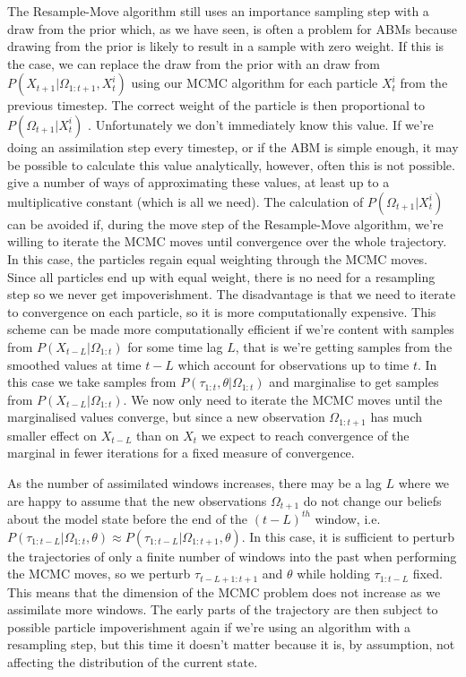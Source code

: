 \documentclass{article}
\begin{document}
The Resample-Move algorithm still uses an importance sampling step with a draw from the prior which, as we have seen, is often a problem for ABMs because drawing from the prior is likely to result in a sample with zero weight. If this is the case, we can replace the draw from the prior with an draw from $P(X_{t+1}|\Omega_{1:{t+1}},X^i_t)$ using our MCMC algorithm for each particle $X^i_t$ from the previous timestep. The correct weight of the particle is then proportional to $P(\Omega_{t+1}|X^i_t)$ \citep{doucet2009tutorial}. Unfortunately we don't immediately know this value. If we're doing an assimilation step every timestep, or if the ABM is simple enough, it may be possible to calculate this value analytically, however, often this is not possible.   \citet*{han2001markov, newton1994approximate, stefankovic2009adaptive} give a number of ways of approximating these values, at least up to a multiplicative constant (which is all we need). The calculation of $P(\Omega_{t+1}|X^i_t)$ can be avoided if, during the move step of the Resample-Move algorithm, we're willing to iterate the MCMC moves until convergence over the whole trajectory. In this case, the particles regain equal weighting through the MCMC moves. Since all particles end up with equal weight, there is no need for a resampling step so we never get impoverishment. The disadvantage is that we need to iterate to convergence on each particle, so it is more computationally expensive. This scheme can be made more computationally efficient if we're content with samples from $P(X_{t-L}|\Omega_{1:t})$ for some time lag $L$, that is we're getting samples from the smoothed values at time $t-L$ which account for observations up to time $t$. In this case we take samples from $P(\tau_{1:t},\theta|\Omega_{1:t})$ and marginalise to get samples from $P(X_{t-L}|\Omega_{1:t})$. We now only need to iterate the MCMC moves until the marginalised values converge, but since a new observation $\Omega_{1:t+1}$ has much smaller effect on $X_{t-L}$ than on $X_{t}$ we expect to reach convergence of the marginal in fewer iterations for a fixed measure of convergence.

As the number of assimilated windows increases, there may be a lag $L$ where we are happy to assume that the new observations $\Omega_{t+1}$ do not change our beliefs about the model state before the end of the $(t-L)^{th}$ window, i.e. $P(\tau_{1:t-L}|\Omega_{1:t},\theta) \approx P(\tau_{1:t-L}|\Omega_{1:t+1},\theta)$. In this case, it is sufficient to perturb the trajectories of only a finite number of windows into the past when performing the MCMC moves, so we perturb $\tau_{t-L+1:t+1}$ and $\theta$ while holding $\tau_{1:t-L}$ fixed. This means that the dimension of the MCMC problem does not increase as we assimilate more windows. The early parts of the trajectory are then subject to possible particle impoverishment again if we're using an algorithm with a resampling step, but this time it doesn't matter because it is, by assumption, not affecting the distribution of the current state.
\end{document}
